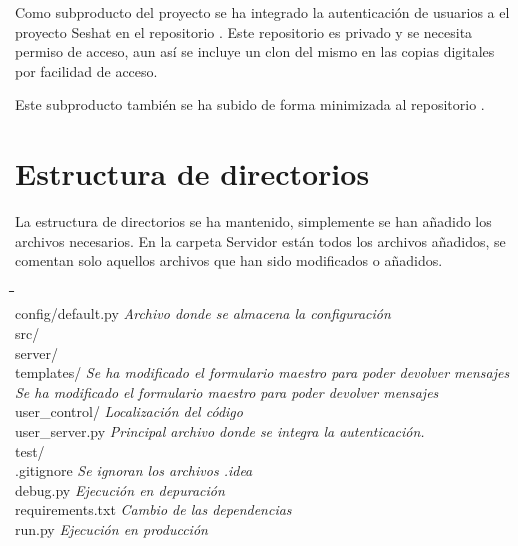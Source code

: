 
Como subproducto del proyecto se ha integrado la autenticación de usuarios a el proyecto Seshat en el repositorio . Este repositorio es privado y se necesita permiso de acceso, aun así se incluye un clon del mismo en las copias digitales por facilidad de acceso.

Este subproducto también se ha subido de forma minimizada al repositorio . 

\section{Estructura de directorios}
La estructura de directorios se ha mantenido, simplemente se han añadido los archivos necesarios. En la carpeta Servidor están todos los archivos añadidos, se comentan solo aquellos archivos que han sido modificados o añadidos.


\begin{tabbing}
\hphantom{tab }\= \hphantom{tab }\= \hphantom{tab }\= \hphantom{tab }\= \hphantom{quadruple tabula}\= \kill\\
config/default.py \> \> \> \> \> \textit{Archivo donde se almacena la configuración} \\
src/ \> \> \> \> \> \\
\> server/ \> \> \> \> \\
\> \> templates/ \> \> \> \textit{Se ha modificado el formulario maestro para poder devolver mensajes} \\
\> \> \> \> \> \textit{Se ha modificado el formulario maestro para poder devolver mensajes} \\
\> user\_control/ \> \> \> \> \textit{Localización del código} \\

\> user\_server.py \> \> \> \> \textit{Principal archivo donde se integra la autenticación.} \\
test/ \> \> \> \> \> \\
.gitignore \> \> \> \> \> \textit{Se ignoran los archivos .idea} \\
debug.py \> \> \> \> \> \textit{Ejecución en depuración} \\
requirements.txt \> \> \> \> \> \textit{Cambio de las dependencias} \\
run.py \> \> \> \> \> \textit{Ejecución en producción} \\
\end{tabbing}

